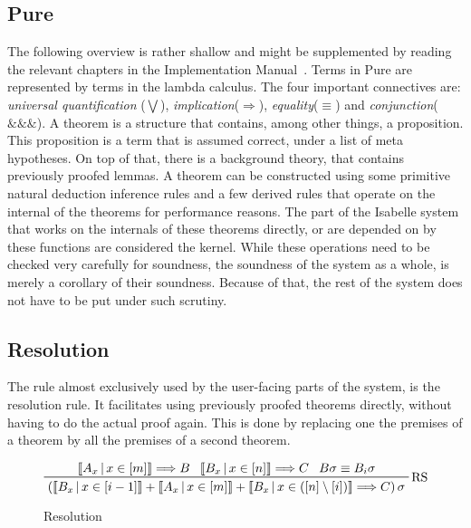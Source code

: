 \subsection{Pure}
The following overview is rather shallow and might be supplemented by reading the relevant chapters in the Implementation Manual~\parencite{implementation}. Terms in Pure are represented by terms in the lambda calculus. The four important connectives are: \textit{universal quantification} ($\bigvee$), \textit{implication}($\Longrightarrow$), \textit{equality}($\equiv$) and \textit{conjunction}($\&\&\&$).\newline
A theorem is a structure that contains, among other things, a proposition. This proposition is a term that is assumed correct, under a list of meta hypotheses. On top of that, there is a background theory, that contains previously proofed lemmas. A theorem can be constructed using some primitive natural deduction inference rules and a few derived rules that operate on the internal of the theorems for performance reasons.\newline
The part of the Isabelle system that works on the internals of these theorems directly, or are depended on by these functions are considered the kernel. While these operations need to be checked very carefully for soundness, the soundness of the system as a whole, is merely a corollary of their soundness. Because of that, the rest of the system does not have to be put under such scrutiny.
\subsection{Resolution}
The rule almost exclusively used by the user-facing parts of the system, is the resolution rule. It facilitates using previously proofed theorems directly, without having to do the actual proof again. This is done by replacing one the premises of a theorem by all the premises of a second theorem.

\begin{figure}[ht]
\begin{displaymath}
    \prftree[r]{RS}
    {\left\llbracket A_x\,\middle|\, x \in \left[ m \right] \right\rrbracket \Longrightarrow B}
    {\left\llbracket B_x\,\middle|\, x \in \left[ n \right] \right\rrbracket \Longrightarrow C}
    {B\sigma \equiv B_i\sigma}
    {\left( \left\llbracket B_x\,\middle|\, x \in \left[ i - 1 \right] \right\rrbracket
    + \left\llbracket A_x\,\middle|\, x \in \left[ m \right] \right\rrbracket
    + \left\llbracket B_x\,\middle|\, x \in \left( \left[ n \right] \setminus \left[ i \right] \right) \right\rrbracket
    \Longrightarrow C \right) \sigma
    }
\end{displaymath}
\caption{Resolution}
\label{fig:res}
\end{figure}

